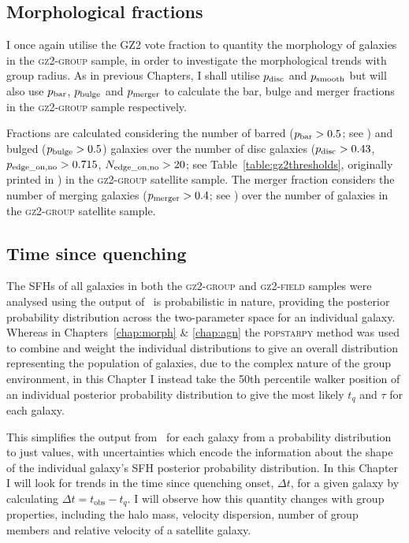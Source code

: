\subsection{Morphological fractions}\label{sec:morphfrac}

I once again utilise the GZ2 vote fraction to quantity the morphology of galaxies in the \textsc{gz2-group} sample, in order to investigate the morphological trends with group radius. As in previous Chapters, I shall utilise $p_{\rm{disc}}$ and $p_{\rm{smooth}}$ but will also use $p_{\rm{bar}}$, $p_{\rm{bulge}}$ and $p_{\rm{merger}}$ to calculate the bar, bulge and merger fractions in the \textsc{gz2-group} sample respectively. 

Fractions are calculated considering the number of barred ($p_{\rm{bar}} > 0.5$; see \citealt{masters11a, cheung13}) and bulged ($p_{\rm{bulge}} > 0.5$) galaxies over the number of disc galaxies ($p_{\rm{disc}} > 0.43$, $p_{\rm{edge\_on, no}} > 0.715$, $N_{\rm{edge\_on, no}} > 20$; see Table~\ref{table:gz2thresholds}, originally printed in \citealt{GZ2}) in the \textsc{gz2-group} satellite sample. The merger fraction considers the number of merging galaxies ($p_{\rm{merger}} > 0.4$; see \citealt{darg10a}) over the number of galaxies in the \textsc{gz2-group} satellite sample. 

\subsection{Time since quenching}\label{sec:delta}

The SFHs of all galaxies in both the \textsc{gz2-group} and \textsc{gz2-field} samples were analysed using \starpy\; the output of \starpy\ is probabilistic in nature, providing the posterior probability distribution across the two-parameter space for an individual galaxy. Whereas in Chapters~\ref{chap:morph} \& \ref{chap:agn} the \textsc{popstarpy} method was used to combine and weight the individual distributions to give an overall distribution representing the population of galaxies, due to the complex nature of the group environment, in this Chapter I instead take the 50th percentile walker position of an individual posterior probability distribution to give the most likely $t_{q}$ and $\tau$ for each galaxy. \

This simplifies the output from \starpy  ~for each galaxy from a probability distribution to just values, with uncertainties which encode the information about the shape of the individual galaxy's SFH posterior probability distribution. In this Chapter I will look for trends in the time since quenching onset, $\Delta t$, for a given galaxy by calculating {\bf $\Delta t = t_\mathrm{obs} - t_{q}$}. I will observe how this quantity changes with group properties, including the halo mass, velocity dispersion, number of group members and relative velocity of a satellite galaxy. 


